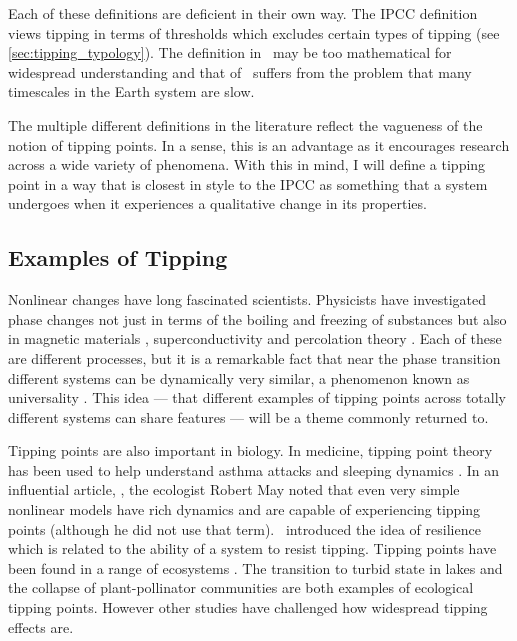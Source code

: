 Each of these definitions are deficient in their own way. The IPCC definition views tipping in terms of thresholds which excludes certain types of tipping (see \cref{sec:tipping_typology}).
The definition in~\cite{Lenton2008} may be too mathematical for widespread understanding and that of~\cite{Wang2023} suffers from the problem that many timescales in the Earth system are slow.

The multiple different definitions in the literature reflect the vagueness of the notion of tipping points. In a sense, this is an advantage as it encourages research across a wide variety
of phenomena. With this in mind, I will define a tipping point in a way that is closest in style to the IPCC as 
something that a system undergoes when it experiences a qualitative change in its properties.

\subsection{Examples of Tipping}

Nonlinear changes have long fascinated scientists. Physicists have investigated phase changes not just in terms of the boiling and freezing of substances but also
in magnetic materials \parencite{Ising1925,Onsager1944}, superconductivity \parencite{Landau1965} and percolation theory \parencite{Flory1941}. Each of these are different processes, but it is a
remarkable fact that near the phase transition different systems can be dynamically very similar, a phenomenon known as universality \parencite{Wilson1983}. This idea --- that different examples
of tipping points across totally different systems can share features --- will be a theme commonly returned to.

Tipping points are also important in biology. In medicine, tipping point theory has been used to help understand asthma attacks \parencite{Donovan2022} and sleeping dynamics \parencite{Skeldon2014}.
In an influential article, \parencite{May1976}, the ecologist Robert May noted that even very simple nonlinear models have rich dynamics and are capable
of experiencing tipping points (although he did not use that term).~\cite{Holling1973} introduced the idea of resilience which is related to the ability of a system to resist tipping. Tipping points have
been found in a range of ecosystems \parencite{Scheffer2001,Dakos2019}. The transition to turbid state in lakes \parencite{Scheffer1993} and the collapse of plant-pollinator communities
\parencite{Lever2014} are both examples of ecological tipping points. However other studies \parencite{Hillebrand2020} have challenged how widespread tipping effects are.


